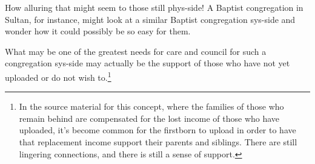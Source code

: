 How alluring that might seem to those still phys-side! A Baptist congregation in Sultan, for instance, might look at a similar Baptist congregation sys-side and wonder how it could possibly be so easy for them.

What may be one of the greatest needs for care and council for such a congregation sys-side may actually be the support of those who have not yet uploaded or do not wish to.\footnote{In the source material for this concept, where the families of those who remain behind are compensated for the lost income of those who have uploaded, it's become common for the firstborn to upload in order to have that replacement income support their parents and siblings. There are still lingering connections, and there is still a sense of support.}
